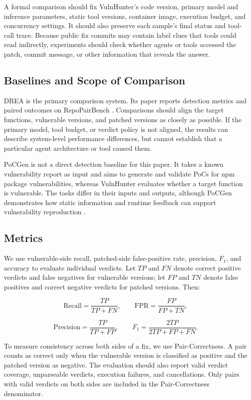 \documentclass[10pt,a4paper]{article}
\begin{document}
A formal comparison should fix VulnHunter's code version, primary model and inference parameters, static tool versions, container image, execution budget, and concurrency settings. It should also preserve each sample's final status and tool-call trace. Because public fix commits may contain label clues that tools could read indirectly, experiments should check whether agents or tools accessed the patch, commit message, or other information that reveals the answer.

\subsection{Baselines and Scope of Comparison}

DREA is the primary comparison system. Its paper reports detection metrics and paired outcomes on RepoPairBench \cite{sun2026drea}. Comparisons should align the target functions, vulnerable versions, and patched versions as closely as possible. If the primary model, tool budget, or verdict policy is not aligned, the results can describe system-level performance differences, but cannot establish that a particular agent architecture or tool caused them.

PoCGen is not a direct detection baseline for this paper. It takes a known vulnerability report as input and aims to generate and validate PoCs for npm package vulnerabilities, whereas VulnHunter evaluates whether a target function is vulnerable. The tasks differ in their inputs and outputs, although PoCGen demonstrates how static information and runtime feedback can support vulnerability reproduction \cite{simsek2026pocgen}.

\subsection{Metrics}

We use vulnerable-side recall, patched-side false-positive rate, precision, \(F_1\), and accuracy to evaluate individual verdicts. Let \(TP\) and \(FN\) denote correct positive verdicts and false negatives for vulnerable versions; let \(FP\) and \(TN\) denote false positives and correct negative verdicts for patched versions. Then:

\[
\mathrm{Recall}=\frac{TP}{TP+FN}, \qquad
\mathrm{FPR}=\frac{FP}{FP+TN},
\]

\[
\mathrm{Precision}=\frac{TP}{TP+FP}, \qquad
F_1=\frac{2TP}{2TP+FP+FN}.
\]

To measure consistency across both sides of a fix, we use Pair-Correctness. A pair counts as correct only when the vulnerable version is classified as positive and the patched version as negative. The evaluation should also report valid verdict coverage, unparseable verdicts, execution failures, and cancellations. Only pairs with valid verdicts on both sides are included in the Pair-Correctness denominator.
\end{document}
